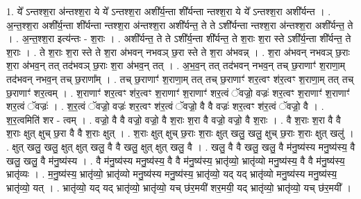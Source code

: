 \documentclass[17pt]{extarticle}
\begin{document}
1. ये᳚ ऽन्तश्श॒रा अ॑न्तश्श॒रा ये ये᳚ ऽन्तश्श॒रा अशी᳚र्य॒न्ता शी᳚र्यन्ता न्तश्श॒रा ये ये᳚ ऽन्तश्श॒रा अशी᳚र्यन्त । . अ॒न्त॒श्श॒रा अशी᳚र्य॒न्ता शी᳚र्यन्ता न्तश्श॒रा अ॑न्तश्श॒रा अशी᳚र्यन्त॒ ते ते ऽशी᳚र्यन्ता न्तश्श॒रा अ॑न्तश्श॒रा अशी᳚र्यन्त॒ ते । . अ॒न्त॒श्श॒रा इत्य॑न्तः - श॒राः । . अशी᳚र्यन्त॒ ते ते ऽशी᳚र्य॒न्ता शी᳚र्यन्त॒ ते श॒राः श॒रा स्ते ऽशी᳚र्य॒न्ता शी᳚र्यन्त॒ ते श॒राः । . ते श॒राः श॒रा स्ते ते श॒रा अ॑भवन् नभवञ् छ॒रा स्ते ते श॒रा अ॑भवन्न् । . श॒रा अ॑भवन् नभवञ् छ॒राः श॒रा अ॑भव॒न् तत् तद॑भवञ् छ॒राः श॒रा अ॑भव॒न् तत् । . अ॒भ॒व॒न् तत् तद॑भवन् नभव॒न् तच् छ॒राणाꣳ॑ श॒राणा॒म् तद॑भवन् नभव॒न् तच् छ॒राणा᳚म् । . तच् छ॒राणाꣳ॑ श॒राणा॒म् तत् तच् छ॒राणाꣳ॑ शर॒त्वꣳ श॑र॒त्वꣳ श॒राणा॒म् तत् तच् छ॒राणाꣳ॑ शर॒त्वम् । . श॒राणाꣳ॑ शर॒त्वꣳ श॑र॒त्वꣳ श॒राणाꣳ॑ श॒राणाꣳ॑ शर॒त्वं ॅवज्रो॒ वज्रः॑ शर॒त्वꣳ श॒राणाꣳ॑ श॒राणाꣳ॑ शर॒त्वं ॅवज्रः॑ । . श॒र॒त्वं ॅवज्रो॒ वज्रः॑ शर॒त्वꣳ श॑र॒त्वं ॅवज्रो॒ वै वै वज्रः॑ शर॒त्वꣳ श॑र॒त्वं ॅवज्रो॒ वै । . श॒र॒त्वमिति॑ शर - त्वम् । . वज्रो॒ वै वै वज्रो॒ वज्रो॒ वै श॒राः श॒रा वै वज्रो॒ वज्रो॒ वै श॒राः । . वै श॒राः श॒रा वै वै श॒राः क्षुत् क्षुच् छ॒रा वै वै श॒राः क्षुत् । . श॒राः क्षुत् क्षुच् छ॒राः श॒राः क्षुत् खलु॒ खलु॒ क्षुच् छ॒राः श॒राः क्षुत् खलु॑ । . क्षुत् खलु॒ खलु॒ क्षुत् क्षुत् खलु॒ वै वै खलु॒ क्षुत् क्षुत् खलु॒ वै । . खलु॒ वै वै खलु॒ खलु॒ वै म॑नु॒ष्य॑स्य मनु॒ष्य॑स्य॒ वै खलु॒ खलु॒ वै म॑नु॒ष्य॑स्य । . वै म॑नु॒ष्य॑स्य मनु॒ष्य॑स्य॒ वै वै म॑नु॒ष्य॑स्य॒ भ्रातृ॑व्यो॒ भ्रातृ॑व्यो मनु॒ष्य॑स्य॒ वै वै म॑नु॒ष्य॑स्य॒ भ्रातृ॑व्यः । . म॒नु॒ष्य॑स्य॒ भ्रातृ॑व्यो॒ भ्रातृ॑व्यो मनु॒ष्य॑स्य मनु॒ष्य॑स्य॒ भ्रातृ॑व्यो॒ यद् यद् भ्रातृ॑व्यो मनु॒ष्य॑स्य मनु॒ष्य॑स्य॒ भ्रातृ॑व्यो॒ यत् । . भ्रातृ॑व्यो॒ यद् यद् भ्रातृ॑व्यो॒ भ्रातृ॑व्यो॒ यच् छ॑र॒मयी॑ शर॒मयी॒ यद् भ्रातृ॑व्यो॒ भ्रातृ॑व्यो॒ यच् छ॑र॒मयी᳚ । \newline
\end{document}
